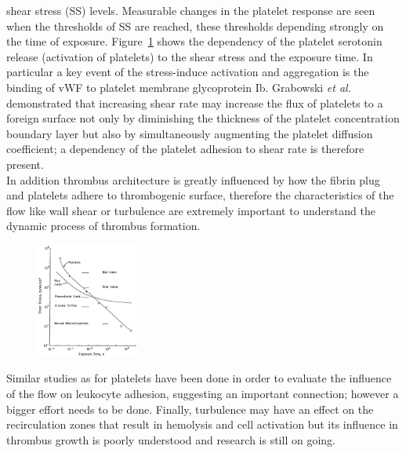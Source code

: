 \documentclass[%
 nofootinbib,
 amsmath,amssymb,
 aps,
 pra,
]{revtex4-1}
\begin{document}
shear stress (SS) levels. Measurable changes in the platelet response are seen when the thresholds of SS are reached, these thresholds depending strongly on the time of exposure. Figure~\ref{diag:ssthreshold} shows the dependency of the platelet serotonin release (activation of platelets) to the shear stress and the exposure time. In particular a key event of the stress-induce activation and aggregation is the binding of vWF to platelet membrane glycoprotein Ib. Grabowski \textit{et al.} \citep{Grabowski:1972} demonstrated that increasing shear rate may increase the flux of platelets to a foreign surface not only by diminishing the thickness of the platelet concentration boundary layer but also by simultaneously augmenting the platelet diffusion coefficient; a dependency of the platelet adhesion to shear rate is therefore present.\\

In addition thrombus architecture is greatly influenced by how the fibrin plug and platelets adhere to thrombogenic surface, therefore the characteristics of the flow like wall shear or turbulence are extremely important to understand the dynamic process of thrombus formation.\\

\begin{figure}[h]
\includegraphics[width=0.3\textwidth]{Figures/hellums_threshold}
\caption{\label{diag:ssthreshold}}
\end{figure}
Similar studies as for platelets have been done in order to evaluate the influence of the flow on leukocyte adhesion, suggesting an important connection; however a bigger effort needs to be done. Finally, turbulence may have an effect on the recirculation zones that result in hemolysis and cell activation but its influence in thrombus growth is poorly understood and research is still on going.
\end{document}
